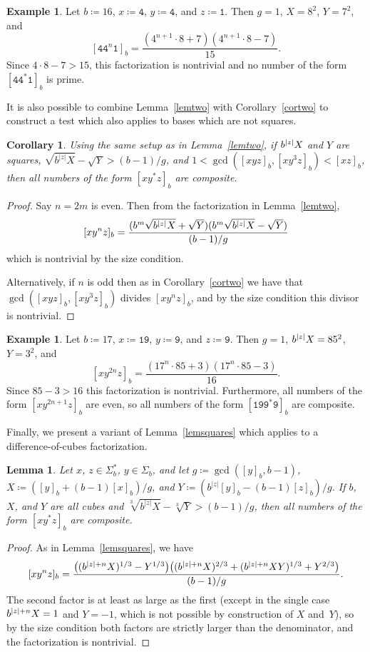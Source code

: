 \documentclass[12pt]{article}
\DeclarePairedDelimiter\abs{\lvert}{\rvert}
\theoremstyle{plain}
\newtheorem{corollary}[theorem]{Corollary}
\newtheorem{lemma}[theorem]{Lemma}
\theoremstyle{definition}
\newtheorem{example}[theorem]{Example}
\newcommand{\0}{\mathtt{0}}
\newcommand{\1}{\mathtt{1}}
\newcommand{\2}{\mathtt{2}}
\newcommand{\3}{\mathtt{3}}
\newcommand{\4}{\mathtt{4}}
\newcommand{\5}{\mathtt{5}}
\newcommand{\6}{\mathtt{6}}
\newcommand{\7}{\mathtt{7}}
\newcommand{\8}{\mathtt{8}}
\newcommand{\9}{\mathtt{9}}
\newcommand{\updated}[1]{{\color{red}#1}}
\renewcommand{\updated}[1]{#1}
\begin{document}
\begin{example}
Let $b\coloneqq16$, $x\coloneqq\4$, $y\coloneqq\4$, and $z\coloneqq\1$.  Then $g=1$, $X=8^2$, $Y=7^2$, and
\[ [\4\4^n\1]_b = \frac{(4^{n+1}\cdot8+7)(4^{n+1}\cdot8-7)}{15} . \]
Since $4\cdot8-7>15$, this factorization is nontrivial and no number of 
the form $[\4\4^*\1]_b$ is prime.
\end{example}

It is also possible to combine Lemma~\ref{lemtwo} with Corollary~\ref{cortwo} 
to construct a test which also applies to bases which are not squares.
\begin{corollary}
Using the same setup as in Lemma~\ref{lemtwo}, if\/ $b^{\abs{z}}X$ and\/ $Y$ 
are squares, $\sqrt{b^{\lvert z\rvert}X}-\sqrt{Y}>(b-1)/g$, and\/
$1<\gcd([xyz]_b,[xy^3z]_b)<[xz]_b$, then all numbers of the form\/ $[xy^*z]_b$ 
are composite.
\end{corollary}
\begin{proof}
Say $n=2m$ is even.  Then from the factorization in Lemma~\ref{lemtwo},
\[ [xy^nz]_b = \frac{(b^m\sqrt{b^{\abs{z}}X}+\sqrt{Y})(b^m\sqrt{b^{\abs{z}}X}-\sqrt{Y})}{(b-1)/g} \]
which is nontrivial by the size condition.

Alternatively, if $n$ is odd then as in Corollary~\ref{cortwo} we have that 
$\gcd([xyz]_b,[xy^3z]_b)$ divides $[xy^nz]_b$, and by the size condition this 
divisor is nontrivial.
\end{proof}
\begin{example}
Let $b\coloneqq17$, $x\coloneqq\1\9$, $y\coloneqq\9$, and $z\coloneqq\9$.  Then $g=1$, 
$b^{\abs{z}}X=85^2$, $Y=3^2$, and
\[ [xy^{2n}z]_b = \frac{(17^n\cdot85+3)(17^n\cdot85-3)}{16} . \]
Since $85-3>16$ this factorization is nontrivial.  Furthermore, all numbers 
of the form $[xy^{2n+1}z]_b$ are even, so all numbers of the form 
$[\1\9\9^*\9]_b$ are composite.
\end{example}
Finally, we present a variant of Lemma~\ref{lemsquares} which applies to a 
difference-of-cubes factorization.
\begin{lemma}\label{lemcubes}
Let\/ $x$, $z\in\Sigma^*_b$, \updated{$y\in\Sigma_b$}, and let\/ $g\coloneqq\gcd([y]_b,b-1)$, 
$X\coloneqq([y]_b+(b-1)[x]_b)/g$, and\/ $Y\coloneqq(b^{\lvert{z}\rvert}[y]_b-(b-1)[z]_b)/g$.
If\/ $b$, $X$, and\/ $Y$ are all cubes and\/ 
$\sqrt[3]{b^{\lvert z\rvert}X}-\sqrt[3]{Y}>(b-1)/g$, then all numbers of 
the form\/
 $[xy^*z]_b$ are composite.
\end{lemma}
\begin{proof}
As in Lemma~\ref{lemsquares}, we have
\[ [xy^nz]_b = \frac{\bigl((b^{\abs{z}+n}X)^{1/3}-Y^{1/3}\bigr)\bigl((b^{\abs{z}+n}X)^{2/3}+(b^{\abs{z}+n}XY)^{1/3}+Y^{2/3}\bigr)}{(b-1)/g} . \]
The second factor is at least as large as the first (except in the 
single case $b^{\abs{z}+n}X=1$ and $Y=-1$, which is not possible by 
construction of $X$ and~$Y$),
so by the size condition both factors are strictly larger than the 
denominator, and the factorization is nontrivial.
\end{proof}
\end{document}

